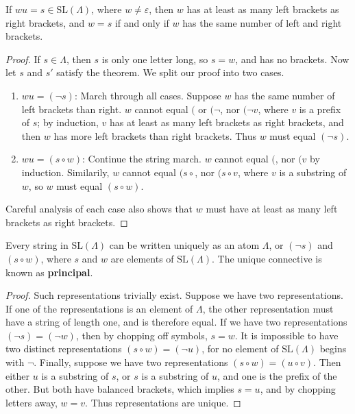 \begin{theorem}
    If $wu = s \in \text{SL}(\Lambda)$, where $w \neq \varepsilon$, then $w$ has at least as many left brackets as right brackets, and $w = s$ if and only if $w$ has the same number of left and right brackets.
\end{theorem}
\begin{proof}
    If $s \in \Lambda$, then $s$ is only one letter long, so $s = w$, and has no brackets. Now let $s$ and $s'$ satisfy the theorem. We split our proof into two cases.
    \begin{enumerate}
        \item $wu = (\neg s)$: March through all cases. Suppose $w$ has the same number of left brackets than right. $w$ cannot equal $($ or $(\neg$, nor $(\neg v$, where $v$ is a prefix of $s$; by induction, $v$ has at least as many left brackets as right brackets, and then $w$ has more left brackets than right brackets. Thus $w$ must equal $(\neg s)$.
        \item $wu = (s \circ w)$: Continue the string march. $w$ cannot equal $($, nor $(v$ by induction. Similarily, $w$ cannot equal $(s \circ$, nor $(s \circ v$, where $v$ is a substring of $w$, so $w$ must equal $(s \circ w)$.
    \end{enumerate}
    Careful analysis of each case also shows that $w$ must have at least as many left brackets as right brackets.
\end{proof}

\begin{corollary}
    Every string in $\text{SL}(\Lambda)$ can be written uniquely as an atom $\Lambda$, or $(\neg s)$ and $(s \circ w)$, where $s$ and $w$ are elements of $\text{SL}(\Lambda)$. The unique connective is known as {\bf principal}.
\end{corollary}
\begin{proof}
    Such representations trivially exist. Suppose we have two representations. If one of the representations is an element of $\Lambda$, the other representation must have a string of length one, and is therefore equal. If we have two representations $(\neg s) = (\neg w)$, then by chopping off symbols, $s = w$. It is impossible to have two distinct representations $(s \circ w) = (\neg u)$, for no element of $\text{SL}(\Lambda)$ begins with $\neg$. Finally, suppose we have two representations $(s \circ w) = (u \circ v)$. Then either $u$ is a substring of $s$, or $s$ is a substring of $u$, and one is the prefix of the other. But both have balanced brackets, which implies $s = u$, and by chopping letters away, $w = v$. Thus representations are unique.
\end{proof}

